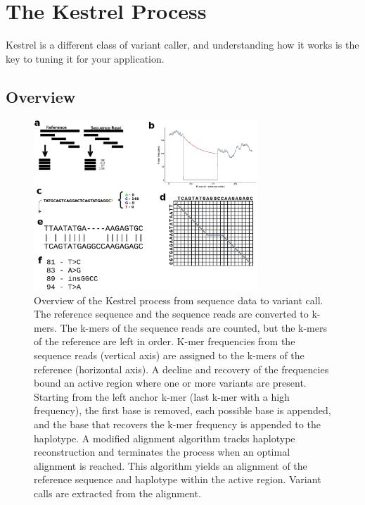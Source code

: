 
\section{The Kestrel Process}
\label{sec.process}

Kestrel is a different class of variant caller, and understanding how it works is the key to tuning it for your application.

\subsection{Overview}
\label{sec.process.overview}

\begin{figure}[H]
	
	\begin{center}
		\includegraphics[width=0.75\textwidth]{img/KestrelOverview}
	\end{center}
	
	\caption{Overview of the Kestrel process from sequence data to variant call.  The reference sequence and the sequence reads are converted to k-mers. The k-mers of the sequence reads are counted, but the k-mers of the reference are left in order.  K-mer frequencies from the sequence reads (vertical axis) are assigned to the k-mers of the reference (horizontal axis). A decline and recovery of the frequencies bound an active region where one or more variants are present.  Starting from the left anchor k-mer (last k-mer with a high frequency), the first base is removed, each possible base is appended, and the base that recovers the k-mer frequency is appended to the haplotype.  A modified alignment algorithm tracks haplotype reconstruction and terminates the process when an optimal alignment is reached.  This algorithm yields an alignment of the reference sequence and haplotype within the active region.  Variant calls are extracted from the alignment.}
	
	\label{fig.arillustration}
\end{figure}

